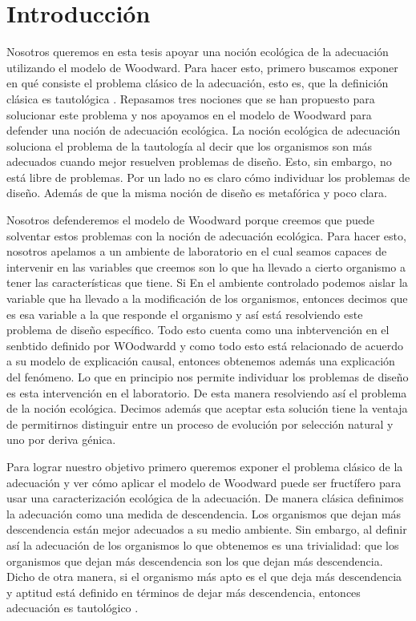 
\chapter*{Introducción}


\noindent Nosotros queremos en esta tesis apoyar una noción ecológica de la adecuación utilizando el modelo de Woodward. Para hacer esto, primero buscamos exponer en qué consiste el problema clásico de la adecuación, esto es, que la definición clásica es tautológica \cite{Paul1992, sep-fitness}. Repasamos tres nociones que se han propuesto para solucionar este problema y nos apoyamos en el modelo de Woodward para defender una noción de adecuación ecológica. La noción ecológica de adecuación soluciona el problema de la tautología al decir que los organismos son más adecuados cuando mejor resuelven problemas de diseño. Esto, sin embargo, no está libre de problemas. Por un lado no es claro cómo individuar los problemas de diseño. Además de que la misma noción de diseño es metafórica y poco clara.

Nosotros defenderemos el modelo de Woodward porque creemos que puede solventar estos problemas con la noción de adecuación ecológica. Para hacer esto, nosotros apelamos a un ambiente de laboratorio en el cual seamos capaces de intervenir en las variables que creemos son lo que ha llevado a cierto organismo a tener las características que tiene. Si En el ambiente controlado podemos aislar la variable que ha llevado a la modificación de los organismos, entonces decimos que es esa variable a la que responde el organismo y así está resolviendo este problema de diseño específico. Todo esto cuenta como una inbtervención en el senbtido definido por WOodwardd y como todo esto está relacionado de acuerdo a su modelo de explicación causal, entonces obtenemos además una explicación del fenómeno. Lo que en principio nos permite individuar los problemas de diseño es esta intervención en el laboratorio. De esta manera resolviendo así el problema de la noción ecológica. Decimos además que aceptar esta solución tiene la ventaja de permitirnos distinguir entre un proceso de evolución por selección natural y uno por deriva génica.

Para lograr nuestro objetivo primero queremos exponer el problema clásico de la adecuación y ver cómo aplicar el modelo de Woodward puede ser fructífero para usar una caracterización ecológica de la adecuación. De manera clásica definimos la adecuación como una medida de descendencia. Los organismos que dejan más descendencia están mejor adecuados a su medio ambiente. Sin embargo, al definir así la adecuación de los organismos lo que obtenemos es una trivialidad: que los organismos que dejan más descendencia son los que dejan más descendencia. Dicho de otra manera, si el organismo más apto es el que deja más descendencia y aptitud está definido en términos de dejar más descendencia, entonces adecuación es tautológico .

